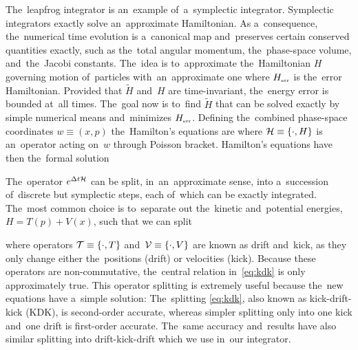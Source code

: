 The~leapfrog integrator is an~example of~a~symplectic integrator. Symplectic integrators exactly solve an~approximate Hamiltonian. As a~consequence, the~numerical time evolution is a~canonical map and~preserves certain conserved quantities exactly, such as the~total angular momentum, the~phase-space volume, and~the~Jacobi constants. The~idea is to~approximate the~Hamiltonian \(H\) governing motion of~particles with~an~approximate one
where \(H_\text{\tiny err}\) is the~error Hamiltonian. Provided that \(\tilde H\) and~\(H\) are time-invariant, the~energy error is bounded at~all times. The~goal now is to~find \(\tilde H\) that can be solved exactly by simple numerical means and~minimizes \(H_\text{\tiny err}\). Defining the~combined phase-space coordinates \(w\equiv(x,p)\) the~Hamilton's equations are
where \(\mathcal{H}\equiv\{\cdot,H\}\) is an~operator acting on~\(w\) through Poisson bracket. Hamilton’s equations have then the~formal solution
\begin{sloppypar}
The~operator \(e^{\Delta t\mathcal{H}}\) can be split, in~an~approximate sense, into a~succession of~discrete but symplectic steps, each of~which can be exactly integrated. The~most common choice is to~separate out the~kinetic and~potential energies, \({H=T(p)+V(x)}\), such that we can split
\end{sloppypar}
where operators \(\mathcal{T}\equiv\{\cdot,T\}\) and~\(\mathcal{V}\equiv\{\cdot,V\}\) are known as drift and~kick, as they only change either the~positions (drift) or velocities (kick). Because these operators are non-commutative, the~central relation in~\eqref{eq:kdk} is only approximately true. This operator splitting is extremely useful because the~new equations have a~simple solution:
The~splitting \eqref{eq:kdk}, also known as kick-drift-kick (KDK), is second-order accurate, whereas simpler splitting only into one kick and~one drift is first-order accurate. The~same accuracy and~results have also similar splitting into drift-kick-drift which we use in~our integrator.
